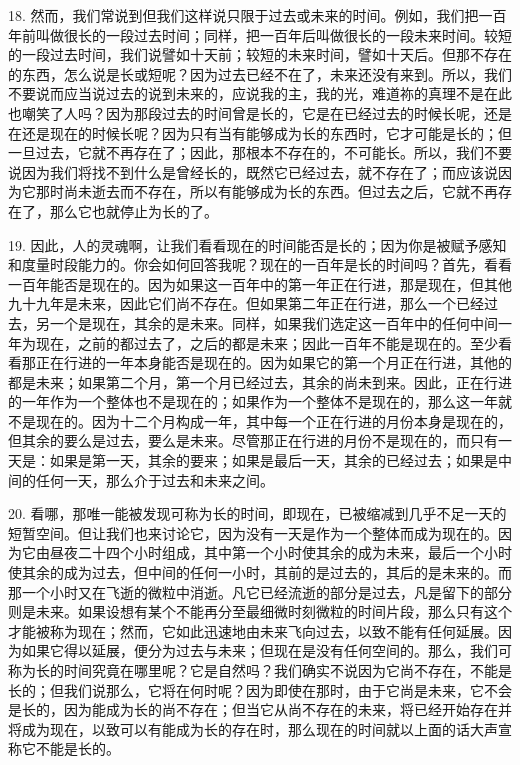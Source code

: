 18. 然而，我们常说到但我们这样说只限于过去或未来的时间。例如，我们把一百年前叫做很长的一段过去时间；同样，把一百年后叫做很长的一段未来时间。较短的一段过去时间，我们说譬如十天前；较短的未来时间，譬如十天后。但那不存在的东西，怎么说是长或短呢？因为过去已经不在了，未来还没有来到。所以，我们不要说而应当说过去的说到未来的，应说我的主，我的光，难道祢的真理不是在此也嘲笑了人吗？因为那段过去的时间曾是长的，它是在已经过去的时候长呢，还是在还是现在的时候长呢？因为只有当有能够成为长的东西时，它才可能是长的；但一旦过去，它就不再存在了；因此，那根本不存在的，不可能长。所以，我们不要说因为我们将找不到什么是曾经长的，既然它已经过去，就不存在了；而应该说因为它那时尚未逝去而不存在，所以有能够成为长的东西。但过去之后，它就不再存在了，那么它也就停止为长的了。\par

19. 因此，人的灵魂啊，让我们看看现在的时间能否是长的；因为你是被赋予感知和度量时段能力的。你会如何回答我呢？现在的一百年是长的时间吗？首先，看看一百年能否是现在的。因为如果这一百年中的第一年正在行进，那是现在，但其他九十九年是未来，因此它们尚不存在。但如果第二年正在行进，那么一个已经过去，另一个是现在，其余的是未来。同样，如果我们选定这一百年中的任何中间一年为现在，之前的都过去了，之后的都是未来；因此一百年不能是现在的。至少看看那正在行进的一年本身能否是现在的。因为如果它的第一个月正在行进，其他的都是未来；如果第二个月，第一个月已经过去，其余的尚未到来。因此，正在行进的一年作为一个整体也不是现在的；如果作为一个整体不是现在的，那么这一年就不是现在的。因为十二个月构成一年，其中每一个正在行进的月份本身是现在的，但其余的要么是过去，要么是未来。尽管那正在行进的月份不是现在的，而只有一天是：如果是第一天，其余的要来；如果是最后一天，其余的已经过去；如果是中间的任何一天，那么介于过去和未来之间。\par

20. 看哪，那唯一能被发现可称为长的时间，即现在，已被缩减到几乎不足一天的短暂空间。但让我们也来讨论它，因为没有一天是作为一个整体而成为现在的。因为它由昼夜二十四个小时组成，其中第一个小时使其余的成为未来，最后一个小时使其余的成为过去，但中间的任何一小时，其前的是过去的，其后的是未来的。而那一个小时又在飞逝的微粒中消逝。凡它已经流逝的部分是过去，凡是留下的部分则是未来。如果设想有某个不能再分至最细微时刻微粒的时间片段，那么只有这个才能被称为现在；然而，它如此迅速地由未来飞向过去，以致不能有任何延展。因为如果它得以延展，便分为过去与未来；但现在是没有任何空间的。那么，我们可称为长的时间究竟在哪里呢？它是自然吗？我们确实不说因为它尚不存在，不能是长的；但我们说那么，它将在何时呢？因为即使在那时，由于它尚是未来，它不会是长的，因为能成为长的尚不存在；但当它从尚不存在的未来，将已经开始存在并将成为现在，以致可以有能成为长的存在时，那么现在的时间就以上面的话大声宣称它不能是长的。\par


